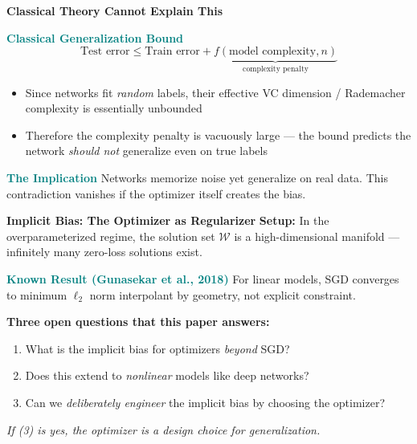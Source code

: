 \documentclass[aspectratio=169]{beamer}
\begin{document}
\begin{frame}{\textcolor{cmindsblue}{\textbf{Classical Theory Cannot Explain This}}}
    \vspace{-0.3cm}
    \begin{block}{\textbf{\textcolor{teal}{Classical Generalization Bound}}}
    $$\text{Test error} \leq \text{Train error} + \underbrace{f(\text{model complexity}, n)}_{\text{complexity penalty}}$$
    \end{block}
    
    \begin{itemize}
        \item Since networks fit \textit{random} labels, their effective VC dimension / Rademacher complexity is essentially unbounded
        \item Therefore the complexity penalty is vacuously large — the bound predicts the network \textit{should not} generalize even on true labels
    \end{itemize}
    
    \begin{block}{\textbf{\textcolor{teal}{The Implication}}}
        Networks memorize noise yet generalize on real data. This contradiction vanishes if the optimizer itself creates the bias.
    \end{block}
\end{frame}

\begin{frame}{\textcolor{cmindsblue}{\textbf{Implicit Bias: The Optimizer as Regularizer}}}
    \vspace{-0.3cm}
    \textbf{Setup:} In the overparameterized regime, the solution set $\mathcal{W}$ is a high-dimensional manifold — infinitely many zero-loss solutions exist.
    
    \begin{block}{\textbf{\textcolor{teal}{Known Result (Gunasekar et al., 2018)}}}
        For linear models, SGD converges to minimum $\ell_2$ norm interpolant by geometry, not explicit constraint.
    \end{block}
    
    \vspace{0.2cm}
    \textbf{Three open questions that this paper answers:}
    \begin{enumerate}
        \item What is the implicit bias for optimizers \textit{beyond} SGD?
        \item Does this extend to \textit{nonlinear} models like deep networks?
        \item Can we \textit{deliberately engineer} the implicit bias by choosing the optimizer?
    \end{enumerate}
    
    \vspace{0.2cm}
    \textit{If (3) is yes, the optimizer is a design choice for generalization.}
\end{frame}
\end{document}
